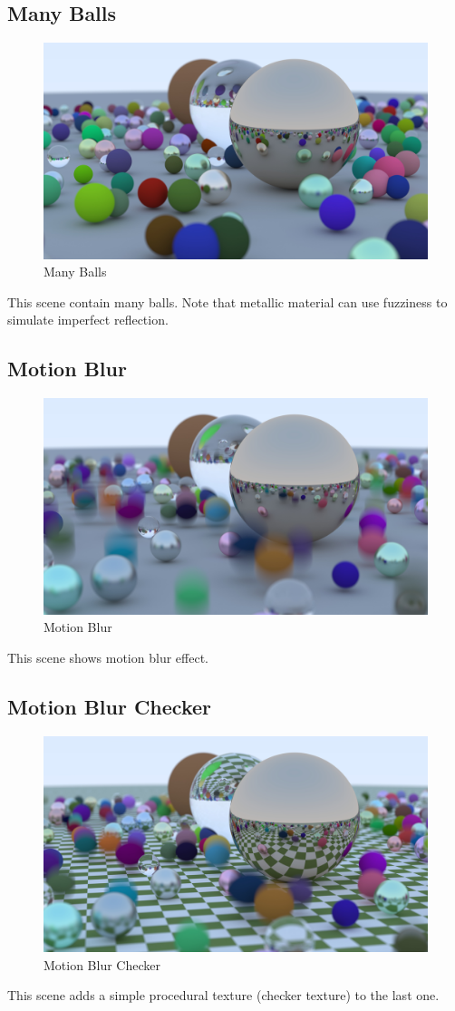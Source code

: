 \documentclass[utf8]{article}
\begin{document}
\subsection{Many Balls}
\begin{figure}[H]
	\centering
	\includegraphics[width=0.7\linewidth]{../results/many_balls}
	\caption{Many Balls}
	\label{fig:manyballs}
\end{figure}
This scene contain many balls. Note that metallic material can use fuzziness to simulate imperfect reflection.

\subsection{Motion Blur}
\begin{figure}[H]
	\centering
	\includegraphics[width=0.7\linewidth]{../results/motion_blur}
	\caption{Motion Blur}
	\label{fig:motionblur}
\end{figure}
This scene shows motion blur effect.

\subsection{Motion Blur Checker}
\begin{figure}[H]
	\centering
	\includegraphics[width=0.7\linewidth]{../results/motion_blur_checker}
	\caption{Motion Blur Checker}
	\label{fig:motionblurchecker}
\end{figure}
This scene adds a simple procedural texture (checker texture) to the last one.
\end{document}
